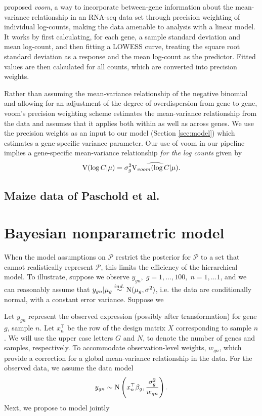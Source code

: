 \cite{voom} proposed \textit{voom}, a way to incorporate between-gene information about the mean-variance relationship in an RNA-seq data set through precision weighting of individual log-counts, making the data amenable to analysis with a linear model. It works by first calculating, for each gene, a sample standard deviation and mean log-count, and then fitting a LOWESS curve, treating the square root standard deviation as a response and the mean log-count as the predictor. Fitted values are then calculated for all counts, which are converted into precision weights.

Rather than assuming the mean-variance relationship of the negative binomial and allowing for an adjustment of the degree of overdispersion from gene to gene, voom's precision weighting scheme estimates the mean-variance relationship from the data and assumes that it applies both within as well as across genes. We use the precision weights as an input to our model (Section \ref{sec:model}) which estimates a gene-specific variance parameter. Our use of voom in our pipeline implies a gene-specific mean-variance relationship \textit{for the log counts} given by
$$\operatorname{V}(\log C|\mu)=\sigma^2_g \widehat{\operatorname{V}_{voom}(\log C|\mu)}.$$


\subsection{Maize data of Paschold et al.}


\section{Bayesian nonparametric model}
When the model assumptions on $\mathcal{P}$ restrict the posterior for $\mathcal{P}$ to a set that cannot realistically represent $\mathcal{P}$, this limits the efficiency of the hierarchical model. To illustrate, suppose we observe $y_{gn},\; g=1,\ldots,100,\;n=1,\ldots 1$, and we can reasonably assume that $y_{gn}|\mu_g \stackrel{ind.}{\sim} \operatorname{N}(\mu_g,\sigma^2)$, i.e. the data are conditionally normal, with a constant error variance. Suppose we 

\label{sec:model}
Let $y_{gn}$ represent the observed expression (possibly after transformation) for gene $g$, sample $n$. Let $x_{n}^\top$ be the row of the design matrix $X$ corresponding to sample $n$. We will use the upper case letters $G$ and $N$, to denote the number of genes and samples, respectively. To accommodate observation-level weights, $w_{gn}$, which provide a correction for a global mean-variance relationship in the data. For the observed data, we assume the data model
\begin{equation}
y_{gn} \sim \operatorname{N} \left( x_{n}^\top \beta_g, \frac{\sigma^2_g}{w_{gn}} \right).
\end{equation}
Next, we propose to model jointly

